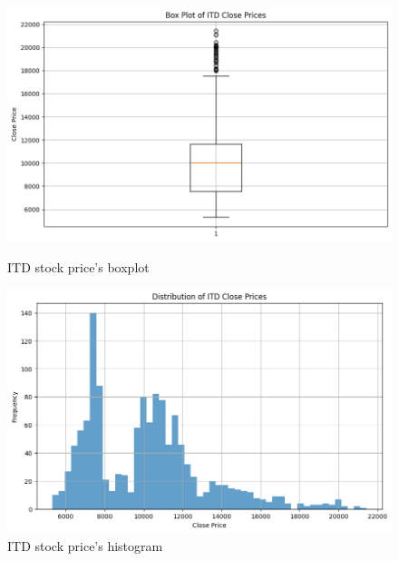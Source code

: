 \documentclass{ieeeojies}
\begin{document}
\begin{figure}[H]
    \centering
    \begin{minipage}{0.23\textwidth}
        \centering
        \includegraphics[width=1\textwidth]{bibliography/Figure/ITD_Boxplot.png}
        \caption{ITD stock price's boxplot}
        \label{fig:1}
    \end{minipage}
    \hfill
    \begin{minipage}{0.23\textwidth}
        \centering
        \includegraphics[width=1\textwidth]{bibliography/Figure/ITD_histogram.png}
        \caption{ITD stock price's histogram}
        \label{fig:2}
    \end{minipage}
\end{figure}
\end{document}
